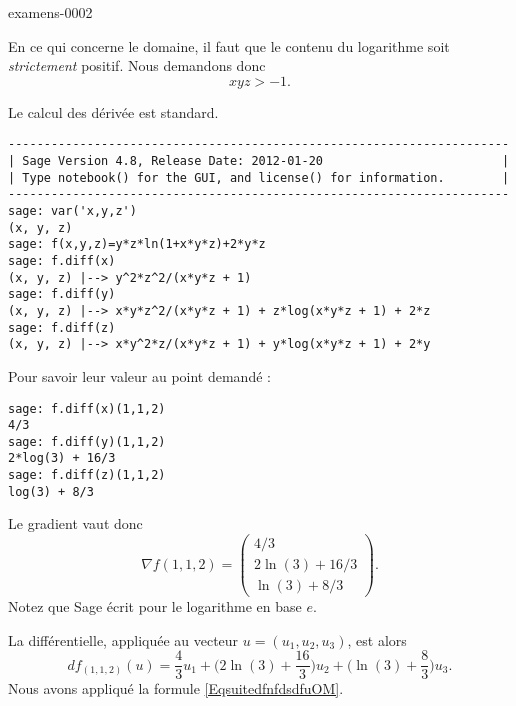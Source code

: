 

\begin{corrige}{examens-0002}

    En ce qui concerne le domaine, il faut que le contenu du logarithme soit \emph{strictement} positif. Nous demandons donc
    \begin{equation}
        xyz>-1.
    \end{equation}

    Le calcul des dérivée est standard. 
    \begin{verbatim}
----------------------------------------------------------------------
| Sage Version 4.8, Release Date: 2012-01-20                         |
| Type notebook() for the GUI, and license() for information.        |
----------------------------------------------------------------------
sage: var('x,y,z')
(x, y, z)
sage: f(x,y,z)=y*z*ln(1+x*y*z)+2*y*z
sage: f.diff(x)
(x, y, z) |--> y^2*z^2/(x*y*z + 1)
sage: f.diff(y)
(x, y, z) |--> x*y*z^2/(x*y*z + 1) + z*log(x*y*z + 1) + 2*z
sage: f.diff(z)
(x, y, z) |--> x*y^2*z/(x*y*z + 1) + y*log(x*y*z + 1) + 2*y
    \end{verbatim}

Pour savoir leur valeur au point demandé :

    \begin{verbatim}
sage: f.diff(x)(1,1,2)         
4/3
sage: f.diff(y)(1,1,2)
2*log(3) + 16/3
sage: f.diff(z)(1,1,2)
log(3) + 8/3
    \end{verbatim}
    

    Le gradient vaut donc
    \begin{equation}
        \nabla f(1,1,2)=\begin{pmatrix}
            4/3\\ 
            2\ln(3)+16/3    \\ 
            \ln(3)+8/3    
        \end{pmatrix}.
    \end{equation}
    Notez que Sage écrit  pour le logarithme en base \( e\).

    La différentielle, appliquée au vecteur \( u=(u_1,u_2,u_3)\), est alors
    \begin{equation}
        df_{(1,1,2)}(u)=\frac{ 4 }{ 3 }u_1+\big( 2\ln(3)+\frac{ 16 }{ 3 } \big)u_2+\big( \ln(3)+\frac{ 8 }{ 3 } \big)u_3.
    \end{equation}
    Nous avons appliqué la formule \eqref{EqsuitedfnfdsdfuOM}.
    
\end{corrige}
